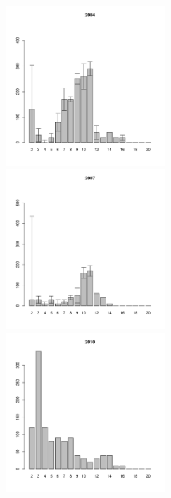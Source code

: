 	\begin{figure}[hp]

	\begin{minipage}[b]{.3\linewidth}
	\begin{center}
	\includegraphics[width=60mm]{../White_Sea/Luvenga_Goreliy/low2_2004_.pdf}
	\end{center}
	\end{minipage}
	\hfill
	\begin{minipage}[b]{.3\linewidth}
	\begin{center}
	\includegraphics[width=60mm]{../White_Sea/Luvenga_Goreliy/low2_2007_.pdf}
	\end{center}
	\end{minipage}
	\hfill
	\begin{minipage}[b]{.3\linewidth}
	\begin{center}
	\includegraphics[width=60mm]{../White_Sea/Luvenga_Goreliy/low2_2010_.pdf}

\end{center}
\end{minipage}
\end{figure}

